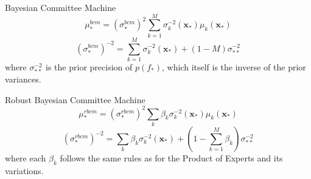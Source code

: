 Bayesian Committee Machine
\begin{equation}
    \mu_*^{bcm} = (\sigma_*^{bcm})^2 \sum_{k=1}^M \sigma_k^{-2} (\mathbf{x_*}) \mu_k (\mathbf{x_*})
\end{equation}
\begin{equation}
    (\sigma_*^{bcm})^{-2} = \sum_{k=1}^M \sigma_k^{-2} (\mathbf{x_*}) + (1-M)\sigma_{**}^{-2}
\end{equation}
where $\sigma_{**}^{-2}$ is the prior precision of $p(f_*)$, which itself is the inverse of the prior variances.

Robust Bayesian Committee Machine
\begin{equation}
    \mu_*^{rbcm} = (\sigma_*^{rbcm})^2 \sum_k \beta_k \sigma_k^{-2} (\mathbf{x_*}) \mu_k (\mathbf{x_*})
\end{equation}
\begin{equation}
    (\sigma_*^{rbcm})^{-2} = \sum_k \beta_k \sigma_k^{-2} (\mathbf{x_*}) + (1-\sum_{k=1}^M \beta_k) \sigma_{**}^{-2}
\end{equation}
where each $\beta_k$ follows the same rules as for the Product of Experts and its variations.

\citep{deisenroth15}

